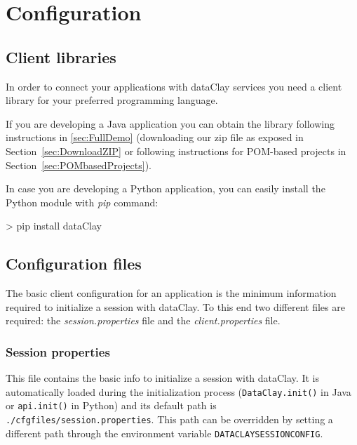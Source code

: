 
\chapter{Configuration}

\section{Client libraries}
\label{sec:ClientLibraries}

In order to connect your applications with dataClay services you need a client library for your preferred programming language.

If you are developing a Java application you can obtain the library following instructions in \ref{sec:FullDemo} (downloading our zip file as exposed in Section~\ref{sec:DownloadZIP} or following instructions for POM-based projects in Section~\ref{sec:POMbasedProjects}).

In case you are developing a Python application, you can easily install the Python module with \textit{pip} command:

\begin{tBox}
\begin{bash}
> pip install dataClay
\end{bash}
\end{tBox}

\section{Configuration files}
\label{sec:ClientConfigFiles}

The basic client configuration for an application is the minimum information required to initialize a session with dataClay. To this end two different files are required: the \textit{session.properties} file and the \textit{client.properties} file.

\subsection{Session properties}
This file contains the basic info to initialize a session with dataClay. It is automatically loaded during the initialization process (\texttt{DataClay.init()} in Java or \texttt{api.init()} in Python) and its default path is \texttt{./cfgfiles/session.properties}. This path can be overridden by setting a different path through the environment variable \texttt{DATACLAYSESSIONCONFIG}. 

